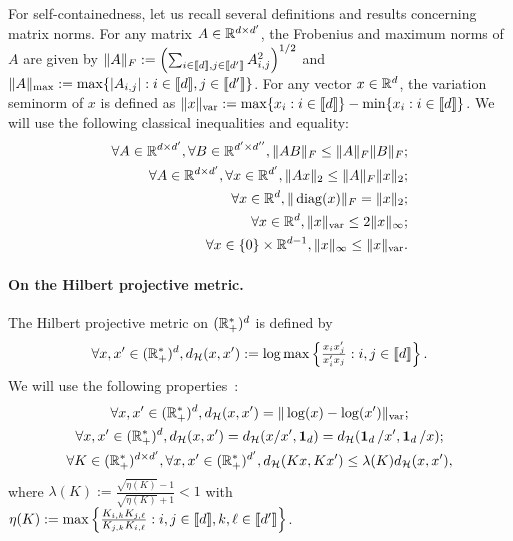 For  self-containedness,  let  us   recall  several  definitions  and  results
concerning  matrix norms.   For  any  matrix $A  \in  \mathbb{R}^{d\times d'}$,  the
Frobenius     and     maximum     norms     of    $A$     are     given     by
$\|A\|_F :=  \left(\sum_{i \in  \llbracket d \rrbracket,  j \in  \llbracket d'
    \rrbracket}                   A_{i,j}^2\right)^{1/2}$                  and
$\|A\|_{\max}  := \max  \{|A_{i,j}| :  i \in  \llbracket d  \rrbracket, j  \in
\llbracket d'  \rrbracket\} $.  For any  vector $x \in \mathbb{R}^d$,  the variation
seminorm           of           $x$          is           defined           as
$\|x\|_{\operatorname{var}} := \max \{x_{i} : i\in \llbracket d \rrbracket \} - \min \{x_{i}
:  i \in  \llbracket d  \rrbracket\}$.  We  will use  the following  classical
inequalities and equality:
\begin{align}
  \label{eq:ineq1}
  \forall  A\in  \mathbb{R}^{d \times  d'},  \forall  B  \in \mathbb{R}^{d'  \times  d''},
  \|AB\|_F \leq  \|A\|_F \|B\|_F;\\
  \label{eq:ineq2}
  \forall A  \in \mathbb{R}^{d \times  d'}, \forall  x \in \mathbb{R}^{d'},  \|Ax\|_2 \leq
  \|A\|_F \|x\|_2;\\
  \label{eq:ineq3}
  \forall x \in \mathbb{R}^{d}, \|\operatorname{diag}(x)\|_F = \|x\|_2;\\
  \label{eq:ineq44}
  \forall x \in \mathbb{R}^{d}, \|x\|_{\operatorname{var}} \leq 2 \|x\|_{\infty};\\
  \label{eq:ineq55}
  \forall x \in \{0\} \times \mathbb{R}^{d-1}, \|x\|_{\infty} \leq \|x\|_{\operatorname{var}}. 
\end{align}
\paragraph{On the Hilbert projective metric.}

The Hilbert projective metric on $(\mathbb{R}_{+}^{*})^{d}$ is defined by
\begin{equation*}
  \forall x, x' \in  (\mathbb{R}_{+}^{*})^{d}, d_{\mathcal{H}}
  (x,x') :=  \log \max\left\{\tfrac{x_i x'_j}{x'_i  x_j} : i,j \in  \llbracket d
    \rrbracket\right\}.
\end{equation*}
We will use the following properties~\cite{Birkhoff}:
\begin{gather}
  \label{eq:ineq4}
  \forall x, x' \in (\mathbb{R}_{+}^{*})^{d}, d_{\mathcal{H}} (x,x') = \| \log(x) -
  \log(x') \|_{\operatorname{var}};\\
  \label{eq:ineq5}
  \forall x, x' \in (\mathbb{R}^{*}_{+})^{d}, d_{\mathcal{H}}(x, x') = d_{\mathcal{H}}(x/x',
  \operatorname{\textbf{1}}_d) = d_{\mathcal{H}}(\operatorname{\textbf{1}}_d/x', \operatorname{\textbf{1}}_d/x);\\
  \label{eq:ineq6}
  \forall K \in (\mathbb{R}_{+}^{*})^{d \times d'}, \forall x, x' \in
  (\mathbb{R}^{*}_{+})^{d'}, d_{\mathcal{H}}(Kx, Kx') \leq \lambda(K) d_{\mathcal{H}}(x, x'),
\end{gather}
where  $\lambda(K) :=  \tfrac{\sqrt{\eta(K)} -1}{\sqrt{\eta(K)}+1}  < 1$  with
$\eta(K) :=  \max\left\{\tfrac{K_{i,k} K_{j,\ell}}{K_{j,k} K_{i, \ell}}  : i,j
  \in \llbracket d \rrbracket, k,\ell \in \llbracket d' \rrbracket\right\}$. 

